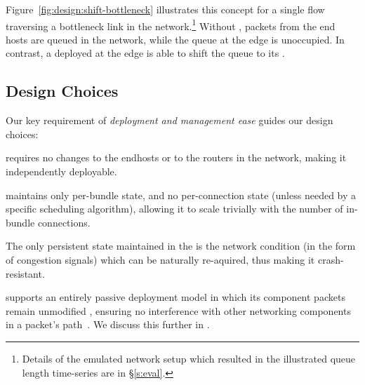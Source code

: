 Figure~\ref{fig:design:shift-bottleneck} illustrates this concept for a single flow traversing a bottleneck link in the network.\footnote{Details of the emulated network setup which resulted in the illustrated queue length time-series are in \S\ref{s:eval}.} Without \name, packets from the end hosts are queued in the network, while the queue at the edge is unoccupied. In contrast, a \name deployed at the edge is able to shift the queue to its \inbox.









\subsection{Design Choices}

Our key requirement of \emph{deployment and management ease} guides our design choices:

 \name requires no changes to the endhosts or to the routers in the network, making it independently deployable. 

 \name maintains only per-bundle state, and no per-connection state (unless needed by a specific scheduling algorithm), allowing it to scale trivially with the number of in-bundle connections. 

 The only persistent state maintained in the \name is the network condition (in the form of congestion signals) which can be naturally re-aquired, thus making it crash-resistant. 

 \name supports an entirely passive deployment model in which its component packets remain unmodified , 
ensuring no interference with other networking components in a packet's path~\cite{mboxbadness, ipoptions, quic}. We discuss this further in .


